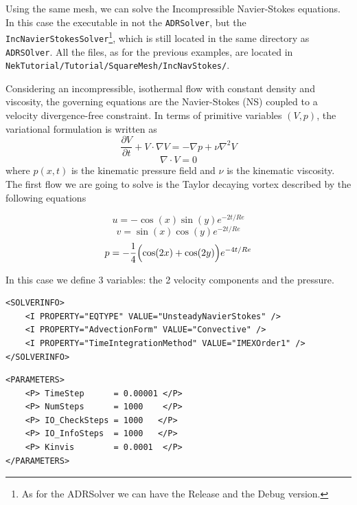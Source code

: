 \documentclass[a4paper,12pt]{article}
\begin{document}
Using the same mesh, we can solve the Incompressible Navier-Stokes
equations. In this case the executable in not the \texttt{ADRSolver},
but the \texttt{IncNavierStokesSolver}\footnote{As for the ADRSolver we can have the
Release and the Debug version.}, which is still located in the same
directory as \texttt{ADRSOlver}. All the files, as for the previous examples,
are located in \texttt{NekTutorial/Tutorial/SquareMesh/IncNavStokes/}.

Considering an incompressible, isothermal flow with constant density
and viscosity, the governing equations are the Navier-Stokes (NS) coupled to a
velocity divergence-free constraint. In terms of primitive variables $(V,p)$,
the variational formulation is written as
\begin{equation}
\frac{\partial V}{\partial t} + V \cdot  \nabla V = -\nabla p + \nu \nabla^2 V
\label{eq:NS1}
\end{equation}
\begin{equation}
\nabla \cdot V = 0
\label{eq:NSequation}
\end{equation}
where $p(x,t)$ is the kinematic pressure field and $\nu$ is the kinematic
viscosity. The first flow we are going to solve is the Taylor decaying vortex
described by the following equations

\begin{equation}
u=-\cos(x)\sin(y)e^{-2t/Re}
\label{eq:Dec1}
\end{equation}
\begin{equation}
v=\sin(x)\cos(y)e^{-2t/Re}
\label{eq:Dec2}
\end{equation}
\begin{equation}
p=-\frac{1}{4}\Bigl(\cos(2x)+\cos(2y)\Bigr)e^{-4t/Re}
\label{eq:Dec3}
\end{equation}

In this case we define 3 variables: the 2 velocity components and the pressure.

\begin{verbatim}
<SOLVERINFO>
    <I PROPERTY="EQTYPE" VALUE="UnsteadyNavierStokes" />
    <I PROPERTY="AdvectionForm" VALUE="Convective" />
    <I PROPERTY="TimeIntegrationMethod" VALUE="IMEXOrder1" />
</SOLVERINFO>
\end{verbatim}

\begin{verbatim}
<PARAMETERS>
    <P> TimeStep      = 0.00001 </P>               
    <P> NumSteps      = 1000    </P>                 
    <P> IO_CheckSteps = 1000   </P>                  
    <P> IO_InfoSteps  = 1000   </P>                 
    <P> Kinvis        = 0.0001  </P>            
</PARAMETERS>
\end{verbatim}
\end{document}
